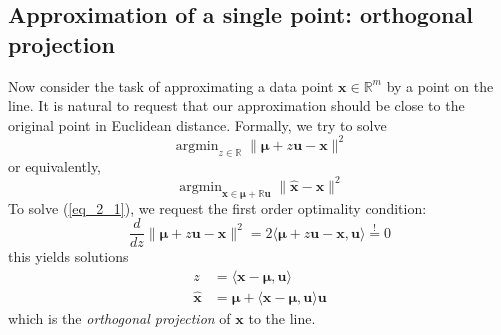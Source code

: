 \documentclass[../main.tex]{subfiles}
\begin{document}
\subsection{Approximation of a single point: orthogonal projection}
Now consider the task of approximating a data point $\bm{x}\in\mathbb{R}^m$ by a point on the line. It is natural to request that our approximation should be close to the original point in Euclidean distance. Formally, we try to solve
\begin{equation}\label{eq_2_1}
\mathop{\arg\min}_{z\in\mathbb{R}}\|\bm{\mu}+z\bm{u}-\bm{x}\|^2
\end{equation}
or equivalently,
\begin{equation*}
\mathop{\arg\min}_{\hat{\bm{x}}\in \bm{\mu} + \mathbb{R}\bm{u}}\|\hat{\bm{x}}-\bm{x}\|^2
\end{equation*}
To solve (\ref{eq_2_1}), we request the first order optimality condition:
\begin{equation*}
\frac{d}{dz}\|\bm{\mu}+z\bm{u}-\bm{x}\|^2 = 2\langle \bm{\mu}+z\bm{u}-\bm{x}, \bm{u}\rangle \overset{!}{=}0
\end{equation*}
this yields solutions
\begin{align*}
z &= \langle \bm{x}-\bm{\mu},\bm{u} \rangle\\
\hat{\bm{x}} &= \bm{\mu} + \langle \bm{x}-\bm{\mu},\bm{u} \rangle \bm{u}
\end{align*}
which is the \emph{orthogonal projection} of $\bm{x}$ to the line. 
\end{document}
